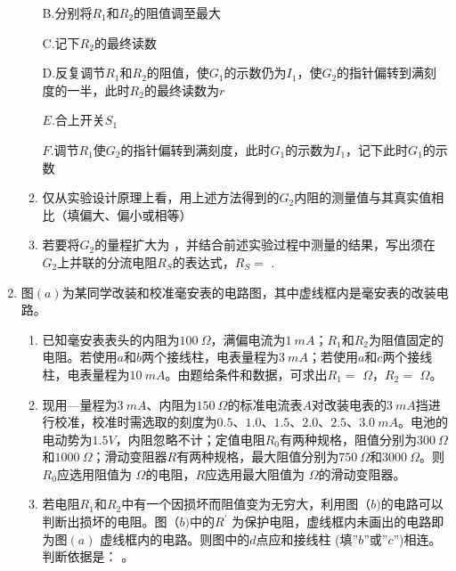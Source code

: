 \begin{enumerate}[leftmargin=0em]
\begin{enumerate}
B.分别将$ R_{1} $和$ R_{2} $的阻值调至最大

C.记下$ R_{2} $的最终读数

D.反复调节$ R_{1} $和$ R_{2} $的阻值，使$ G_{1} $的示数仍为$ I_{1} $，使$ G_{2} $的指针偏转到满刻度的一半，此时$ R_{2} $的最终读数为$ r $

$ E $.合上开关$ S_{1} $

$ F $.调节$ R_{1} $使$ G_{2} $的指针偏转到满刻度，此时$ G_{1} $的示数为$ I_{1} $，记下此时$ G_{1} $的示数

\item 
仅从实验设计原理上看，用上述方法得到的$ G_{2} $内阻的测量值与其真实值相比（填偏大、偏小或相等）
\item 
若要将$ G_{2} $的量程扩大为  ，并结合前述实验过程中测量的结果，写出须在$ G_{2} $上并联的分流电阻$ R_S $的表达式，$ R_S= $  .



\end{enumerate}


\newpage
\item 
{}
图$ (a) $为某同学改装和校准毫安表的电路图，其中虚线框内是毫安表的改装电路。
\begin{figure}[h!]
\centering

\end{figure}

\begin{enumerate}
\renewcommand{\labelenumii}{(\arabic{enumii})}
\item 
已知毫安表表头的内阻为$ 100 \ \Omega $，满偏电流为$ 1 \ mA $；$ R_{1} $和$ R_{2} $为阻值固定的电阻。若使用$ a $和$ b $两个接线柱，电表量程为$ 3 \ mA $；若使用$ a $和$ c $两个接线柱，电表量程为$ 10 \ mA $。由题给条件和数据，可求出$ R_{1} = $  $ \Omega $，$ R_{2} = $  $ \Omega $。


\item 
现用—量程为$ 3 \ mA $、内阻为$ 150 \ \Omega $的标准电流表$ A $对改装电表的$ 3 \ mA $挡进行校准，校准时需选取的刻度为$ 0.5 $、$ 1.0 $、$ 1.5 $、$ 2.0 $、$ 2.5 $、$ 3.0 \ mA $。电池的电动势为$ 1.5V $，内阻忽略不计；定值电阻$ R_{0} $有两种规格，阻值分别为$ 300 \ \Omega $和$ 1000 \ \Omega $；滑动变阻器$ R $有两种规格，最大阻值分别为$ 750 \ \Omega $和$ 3000 \ \Omega $。则$ R_{0} $应选用阻值为  $ \Omega $的电阻，$ R $应选用最大阻值为  $ \Omega $的滑动变阻器。


\item 
若电阻$ R_{1} $和$ R_{2} $中有一个因损坏而阻值变为无穷大，利用图（$ b) $的电路可以判断出损坏的电阻。图（$ b) $中的$ R ^{\prime} $ 为保护电阻，虚线框内未画出的电路即为图$ (a) $ 虚线框内的电路。则图中的$ d $点应和接线柱  (填”$ b $”或”$ c $”)相连。判断依据是：  。

\end{enumerate}








\end{enumerate}


